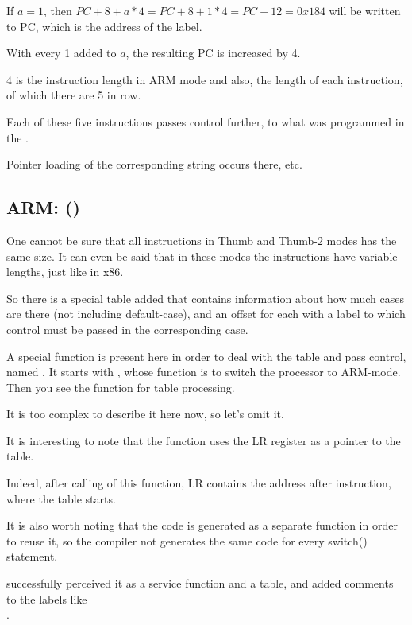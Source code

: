 If $a=1$, then $PC+8+a*4 = PC+8+1*4 = PC+12 = 0x184$ will be written to \ac{PC},
which is the address of the  label.

With every 1 added to $a$, the resulting \ac{PC} is increased by 4.

4 is the instruction length in ARM mode and also, the length of each  instruction,
of which there are 5 in row.

Each of these five  instructions passes control further, to what was programmed in the .

Pointer loading of the corresponding string occurs there, etc.

\subsection{ARM: \OptimizingKeilVI (\ThumbMode)}




One cannot be sure that all instructions in Thumb and Thumb-2 modes has the same size.
It can even be said that in these modes the instructions have variable lengths, just like in x86.


So there is a special table added that contains information about how much cases are there (not including 
default-case), and an offset for each with a label to which control must be passed in 
the corresponding case.


A special function is present here in order to deal with the table and pass control, named
. 
It starts with , whose function is to switch the processor to ARM-mode.
Then you see the function for table processing. 

It is too complex to describe it here now, so let's omit it.


It is interesting to note that the function uses the \ac{LR} register as a pointer to the table.

Indeed, after calling of this function, \ac{LR} contains the address after
 instruction, where the table starts.

It is also worth noting that the code is generated as a separate function in order to reuse it, 
so the compiler not generates the same code for every switch() statement.

\IDA successfully perceived it as a service function and a table, and added comments to the labels like\\
.

